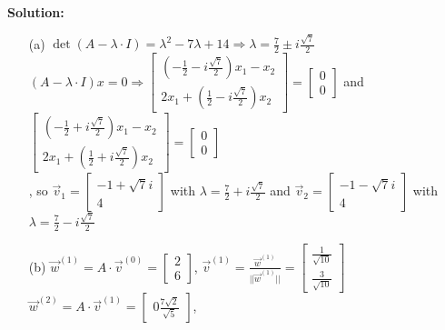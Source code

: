 \documentclass[12pt]{article}
\begin{document}
\begin{enumerate}[label=\bfseries Problem \arabic*:]
\vspace{1em}
\textbf{Solution:}\\
\begin{itemize}
    \item [(a)] $\det(A-\lambda\cdot I)=\lambda^2-7\lambda+14\Rightarrow\lambda=\frac{7}{2}\pm i\frac{\sqrt{7}}{2}$\\
    $(A-\lambda\cdot I)x=0\Rightarrow
    \begin{bmatrix}
    (-\frac{1}{2}-i\frac{\sqrt{7}}{2})x_1-x_2\\
    2x_1+(\frac{1}{2}-i\frac{\sqrt{7}}{2})x_2
    \end{bmatrix}
    =
    \begin{bmatrix}
    0\\
    0
    \end{bmatrix}$
    and 
    $\begin{bmatrix}
    (-\frac{1}{2}+i\frac{\sqrt{7}}{2})x_1-x_2\\
    2x_1+(\frac{1}{2}+i\frac{\sqrt{7}}{2})x_2
    \end{bmatrix}
    =
    \begin{bmatrix}
    0\\
    0
    \end{bmatrix}$\\
    , so $\vec{v}_1=
    \begin{bmatrix}
    -1+\sqrt{7}i\\
    4
    \end{bmatrix}$
    with $\lambda=\frac{7}{2}+i\frac{\sqrt{7}}{2}$
    and $\vec{v}_2=
    \begin{bmatrix}
    -1-\sqrt{7}i\\
    4
    \end{bmatrix}$
    with $\lambda=\frac{7}{2}-i\frac{\sqrt{7}}{2}$
    \item [(b)] 
    $\vec{w}^{(1)}=A\cdot \vec{v}^{(0)}=\begin{bmatrix}
    2\\
    6   
    \end{bmatrix}$, 
    $\vec{v}^{(1)}=\frac{\vec{w}^{(1)}}{||\vec{w}^{(1)}||}=\begin{bmatrix}
    \frac{1}{\sqrt{10}}\\
    \frac{3}{\sqrt{10}}
    \end{bmatrix}$\\
    $\vec{w}^{(2)}=A\cdot \vec{v}^{(1)}=\begin{bmatrix}
    0
    \frac{7\sqrt{2}}{\sqrt{5}}
    \end{bmatrix}$, 

\end{itemize}
\end{enumerate}
\end{document}
